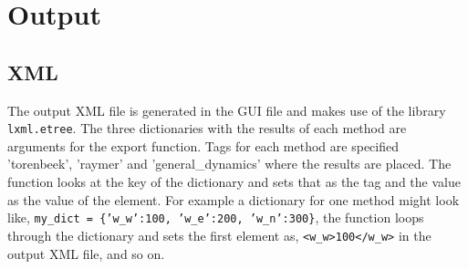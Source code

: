 \section{Output}
\label{sec:output}

\subsection{XML}
The output XML file is generated in the GUI file and makes use of the library \texttt{lxml.etree}.
The three dictionaries with the results of each method are arguments for the export function.
Tags for each method are specified 'torenbeek', 'raymer' and 'general\_dynamics' where the results are placed.
The function looks at the key of the dictionary and sets that as the tag and the value as the value of the element.
For example a dictionary for one method might look like, \texttt{my\_dict = \{'w\_w':100, 'w\_e':200, 'w\_n':300\}}, the function loops through the dictionary and sets the first element as, \texttt{\textless w\_w\textgreater 100\textless/w\_w\textgreater} in the output XML file, and so on.

